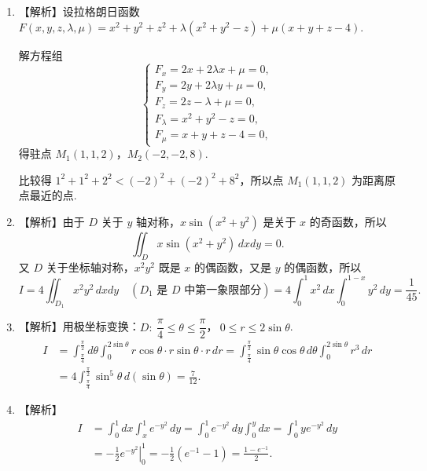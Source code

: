 \documentclass[a4paper,11pt]{ctexart}
\begin{document}
\begin{enumerate}[label=\arabic*、, leftmargin=2.2em, itemsep=0.9em, topsep=0.6em]
  则两个曲面的法矢量分别为：
  \[
    \vec{n}_F = \{2x, 2y, 2z\}\big|_P = \{2, 2, 2\sqrt{2}\} \parallel \{1, 1, \sqrt{2}\}, \quad
    \vec{n}_G = \{2(x-1), 2y, 0\}\big|_P = \{0, 2, 0\} \parallel \{0, 1, 0\}.
  \]
  切向量可取为 $\vec{T} = \{1, 1, \sqrt{2}\} \times \{0, 1, 0\} = \{-\sqrt{2}, 0, 1\}$.

  所以法平面方程 $-\sqrt{2}(x-1) + 0\cdot(y-1) + (z - \sqrt{2}) = 0$，即 $z = \sqrt{2}x$.

  \item 【解析】设拉格朗日函数 $F(x,y,z,\lambda,\mu) = x^2 + y^2 + z^2 + \lambda(x^2 + y^2 - z) + \mu(x + y + z - 4)$.

  解方程组
  \[
    \begin{cases}
      F_x = 2x + 2\lambda x + \mu = 0, \\
      F_y = 2y + 2\lambda y + \mu = 0, \\
      F_z = 2z - \lambda + \mu = 0, \\
      F_\lambda = x^2 + y^2 - z = 0, \\
      F_\mu = x + y + z - 4 = 0,
    \end{cases}
  \]
  得驻点 $M_1(1,1,2)$，$M_2(-2,-2,8)$.

  比较得 $1^2 + 1^2 + 2^2 < (-2)^2 + (-2)^2 + 8^2$，所以点 $M_1(1,1,2)$ 为距离原点最近的点.

  \item 【解析】由于 $D$ 关于 $y$ 轴对称，$x\sin(x^2+y^2)$ 是关于 $x$ 的奇函数，所以
  \[
    \iint_D x\sin(x^2+y^2)\,dxdy = 0.
  \]
  又 $D$ 关于坐标轴对称，$x^2y^2$ 既是 $x$ 的偶函数，又是 $y$ 的偶函数，所以
  \[
    I = 4\iint_{D_1} x^2y^2\,dxdy \quad (\text{$D_1$ 是 $D$ 中第一象限部分}) = 4\int_0^1 x^2\,dx \int_0^{1-x} y^2\,dy = \frac{1}{45}.
  \]

  \item 【解析】用极坐标变换：$D:\ \dfrac{\pi}{4} \le \theta \le \dfrac{\pi}{2}$，$\ 0 \le r \le 2\sin\theta$.
  \begin{align*}
    I &= \int_{\frac{\pi}{4}}^{\frac{\pi}{2}} d\theta \int_0^{2\sin\theta} r\cos\theta \cdot r\sin\theta \cdot r\,dr = \int_{\frac{\pi}{4}}^{\frac{\pi}{2}} \sin\theta\cos\theta\,d\theta \int_0^{2\sin\theta} r^3\,dr \\
      &= 4\int_{\frac{\pi}{4}}^{\frac{\pi}{2}} \sin^5\theta\,d(\sin\theta) = \frac{7}{12}.
  \end{align*}

  \item 【解析】
  \begin{align*}
    I &= \int_0^1 dx \int_x^1 e^{-y^2}\,dy = \int_0^1 e^{-y^2}\,dy \int_0^y dx = \int_0^1 y e^{-y^2}\,dy \\
      &= \left.-\frac{1}{2}e^{-y^2}\right|_0^1 = -\frac{1}{2}(e^{-1} - 1) = \frac{1 - e^{-1}}{2}.
  \end{align*}


\end{enumerate}
\end{document}
